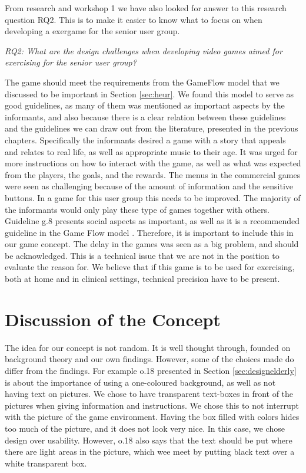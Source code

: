 From research and workshop 1 we have also looked for answer to this research question RQ2. This is to make it easier to know what to focus on when developing a exergame for the senior user group.

\emph{RQ2: What are the design challenges when developing video games aimed for exercising for the senior user group?}

The game should meet the requirements from the GameFlow model \cite{sweetser} that we discussed to be important in Section \ref{sec:heur}. We found this model to serve as good guidelines, as many of them was mentioned as important aspects by the informants, and also because there is a clear relation between these guidelines and the guidelines we can draw out from the literature, presented in the previous chapters. Specifically the informants desired a game with a story that appeals and relates to real life, as well as appropriate music to their age. It was urged for more instructions on how to interact with the game, as well as what was expected from the players, the goals, and the rewards. The menus in the commercial games were seen as challenging because of the amount of information and the sensitive buttons. In a game for this user group this needs to be improved. The majority of the informants would only play these type of games together with others. Guideline g.8 presents social aspects as important, as well as it is a recommended guideline in the Game Flow model \cite{sweetser}. Therefore, it is important to include this in our game concept. The delay in the games was seen as a big problem, and should be acknowledged.  This is a technical issue that we are not in the position to evaluate the reason for. We believe that if this game is to be used for exercising, both at home and in clinical settings, technical precision have to be present. 

\section{Discussion of the Concept}
\label{sec:discconcept}
The idea for our concept is not random. It is well thought through, founded on background theory and our own findings. However, some of the choices made do differ from the findings. For example o.18 presented in Section \ref{sec:designelderly} is about the importance of using a one-coloured background, as well as not having text on pictures. We chose to have transparent text-boxes in front of the pictures when giving information and instructions. We chose this to not interrupt with the picture of the game environment. Having the box filled with colors hides too much of the picture, and it does not look very nice. In this case, we chose design over usability. However, o.18 also says that the text should be put where there are light areas in the picture, which wee meet by putting black text over a white transparent box.    

